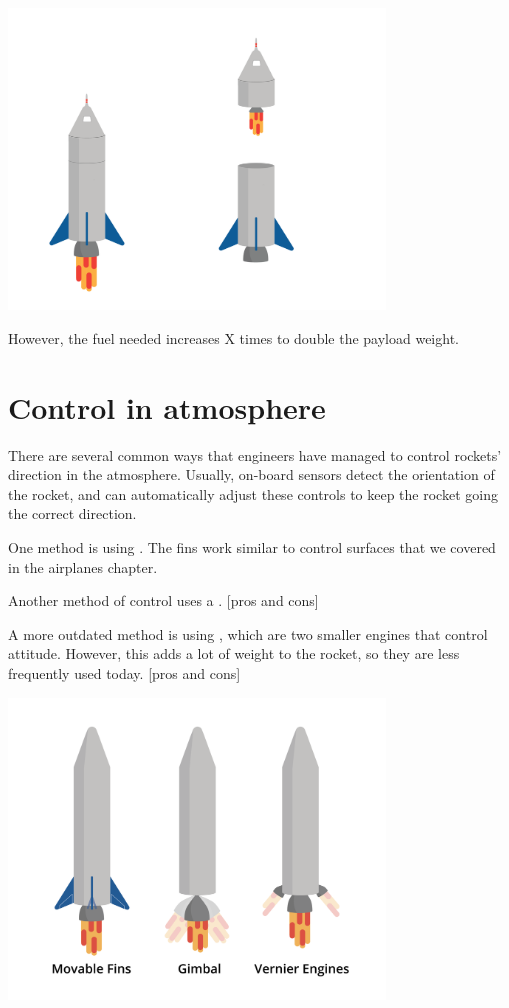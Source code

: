 \includegraphics[width=0.75\textwidth]{stagingDual.png}


	However, the fuel needed increases X times to double the payload weight.



\section{Control in atmosphere}

There are several common ways that engineers have managed to control rockets' direction in the atmosphere. Usually, on-board sensors detect the orientation of the rocket, and can automatically adjust these controls to keep the rocket going the correct direction.

	
	One method is using . The fins work similar to control surfaces that we covered in the airplanes chapter. 



	Another method of control uses a . [pros and cons]
	
	A more outdated method is using , which are two smaller engines that control attitude. However, this adds a lot of weight to the rocket, so they are less frequently used today. [pros and cons]


\includegraphics[width=0.75\textwidth]{control.png}


